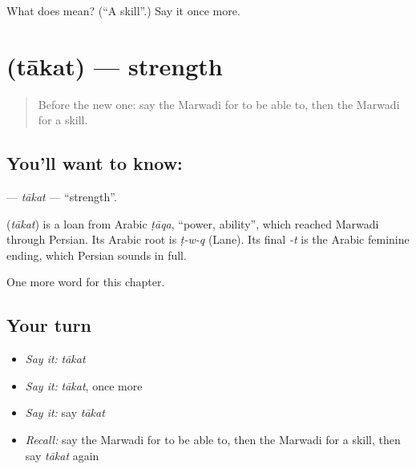 \begin{tcolorbox}[breakable,colback=teal!4,colframe=teal!35!black,title={Before you move on}]
What does  mean? (\textquotedblleft{}A skill\textquotedblright{}.) Say it once more.
\end{tcolorbox}
\section[\texorpdfstring{\mw{ताकत} (tākat)}{ताकत (tākat)}]{ (tākat) — strength}

\label{lesson:MW-C114-takat}



\begin{quote}
Before the new one: say the Marwadi for to be able to, then the Marwadi for a skill.
\end{quote}

\subsection*{You'll want to know: }
\textbf{} — \emph{tākat} — \textquotedblleft{}strength\textquotedblright{}.

\begin{cousinweb}
\textbf{} (\emph{tākat}) is a loan from Arabic \emph{ṭāqa}, \textquotedblleft{}power, ability\textquotedblright{}, which reached Marwadi through Persian. Its Arabic root is \emph{ṭ-w-q} (Lane). Its final \emph{-t} is the Arabic feminine ending, which Persian sounds in full.
\end{cousinweb}

\begin{grammarlens}[title={What you've built}]
One more word for this chapter.
\end{grammarlens}

\subsection*{Your turn}
\begin{itemize}
\raggedright
  \item \emph{Say it:} \emph{tākat}
  \item \emph{Say it:} \emph{tākat}, once more
  \item \emph{Say it:} say \emph{tākat}
  \item \emph{Recall:} say the Marwadi for to be able to, then the Marwadi for a skill, then say \emph{tākat} again
\end{itemize}

